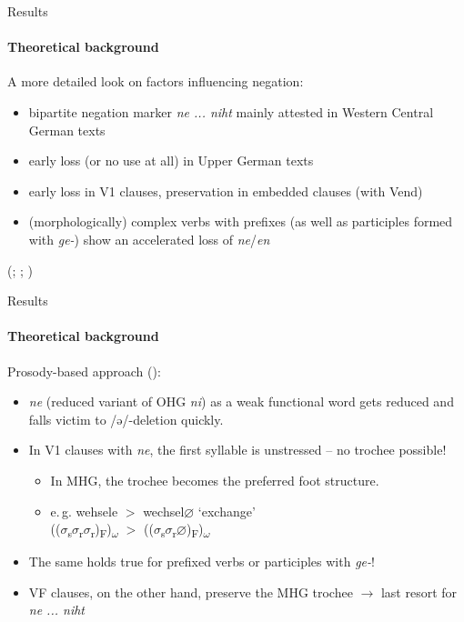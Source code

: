 \documentclass[xcolor=table, compress, %
handout
]{beamer}
\begin{document}
\begin{frame}{Results}
\framesubtitle{Theoretical background}

A more detailed look on factors influencing negation:

\begin{itemize}
    \item bipartite negation marker \textit{ne ... niht} mainly attested in Western Central German texts 
    \item early loss (or no use at all) in Upper German texts
    \item early loss in V1 clauses, preservation in embedded clauses (with Vend)
    \item (morphologically) complex verbs with prefixes (as well as participles formed with \textit{ge-}) show an accelerated loss of \textit{ne}/\textit{en}
\end{itemize}

{\tiny (\citealt{behaghel18,Gaertner1977,Pickl2017}; \citealt{schueler16,schueler17}; \citealt{hrbek21})}

\end{frame}


\begin{frame}{Results}
\framesubtitle{Theoretical background}

Prosody-based approach (\citealt{HertelimErscheinen}):

\begin{itemize}
    \item \textit{ne} (reduced variant of OHG \textit{ni}) as a weak functional word gets reduced and falls victim to /ə/-deletion quickly.
    \item In V1 clauses with \textit{ne}, the first syllable is unstressed – no trochee possible!
    \begin{itemize}
    \item In MHG, the trochee becomes the preferred foot structure.
    \item e.\,g. wehsele $>$  wechsel\alert{$\varnothing$} ‘exchange’\\
(($\sigma$\textsubscript{s}$\sigma$\textsubscript{r}\alert{$\sigma$\textsubscript{r}})\textsubscript{F})\textsubscript{$\omega$} $>$   (($\sigma$\textsubscript{s}$\sigma$\textsubscript{r}\alert{$\varnothing$})\textsubscript{F})\textsubscript{$\omega$}
    \end{itemize}
    \item The same holds true for prefixed verbs or participles with \textit{ge-}!
    \item VF clauses, on the other hand, preserve the MHG trochee $\rightarrow$ last resort for \textit{ne ... niht}
\end{itemize}

\end{frame}
\end{document}
